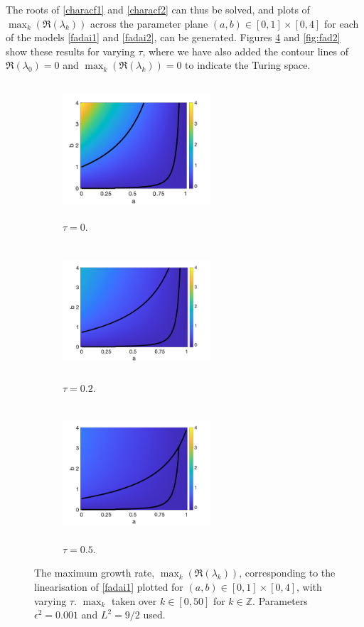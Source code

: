 The roots of \eqref{characf1} and \eqref{characf2} can thus be solved, and plots of $\max_k(\Re(\lambda_k))$ across the parameter plane $(a,b)\in[0,1]\times[0,4]$ for each of the models \eqref{fadai1} and \eqref{fadai2}, can be generated. Figures \ref{fig:fad1} and \ref{fig:fad2} show these results for varying $\tau$, where we have also added the contour lines of $\Re(\lambda_0)=0$ and $\max_k(\Re(\lambda_k))=0$ to indicate the Turing space.
\begin{figure}[H]
    \centering
    \begin{subfigure}[t]{0.32\textwidth}
        \centering
        \includegraphics[width=5.5cm,height = 5cm]{f1t0.png}
        \caption{$\tau=0$.}
        \label{}
    \end{subfigure}
    \hfill
    \begin{subfigure}[t]{0.32\textwidth}
        \centering
        \includegraphics[width=5.5cm,height = 5cm]{f1t02.png}
        \caption{$\tau=0.2$.}
        \label{}
    \end{subfigure}
    \hfill
    \begin{subfigure}[t]{0.32\textwidth}
        \centering
        \includegraphics[width=5.5cm,height = 5cm]{f1t05.png}
        \caption{$\tau=0.5$.}
        \label{f}
    \end{subfigure}
    \caption{The maximum growth rate, $\max_k(\Re(\lambda_k))$, corresponding to the linearisation of \eqref{fadai1} plotted for $(a,b)\in[0,1]\times[0,4]$, with varying $\tau$. $\max_k$ taken over $k\in[0,50]$ for $k\in\mathbb{Z}$. Parameters $\epsilon^2=0.001$ and $L^2=9/2$ used.}
    \label{fig:fad1}
\end{figure}
